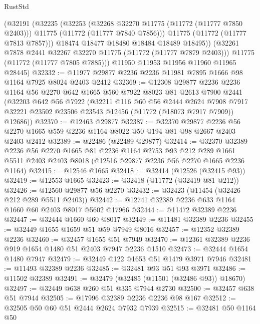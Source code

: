 \begin{lexlean}{RustStd}
\begin{coremodule}
          (@32191
            (@32235
              (@32253
                (@32268 @32270 @11775 (@11772 (@11777 @7850 @2403)))
                @11775
                (@11772 (@11777 @7840 @7856)))
              @11775
              (@11772 (@11777 @7813 @7857)))
            @18474
            @18477
            @18480
            @18484
            @18489
            @18495))
        (@32261 @7878 @2441 @32267 @32270 @11775 (@11772 (@11777 @7879 @2403)))
        @11775
        (@11772 (@11777 @7805 @7885)))
      @11950
      @11953
      @11956
      @11960
      @11965
      @28445)
@32332 := @11977 @29877 @2236 @2236 @11981 @7895 @1666 @98 @1164 @7925 @8024 @2403 @2412
@32369 := @12308
    @29877
    @2236
    @2236
    @1164
    @56
    @2270
    @642
    @1665
    @560
    @7922
    @8023
    @81
    @2613
    @7900
    @2441
    (@32203
      @642
      @56
      @7922
      (@32211
        @116
        @60
        @56
        @2444
        @2624
        @7908
        @7917
        @32221
        @23502
        @23506
        @23543
        @12456
        (@11772 (@18073 @7917 @7909))
        @12686))
@32370 := @12463 @29877
@32387 := @32370
    @29877
    @2236
    @56
    @2270
    @1665
    @559
    @2236
    @1164
    @8022
    @50
    @194
    @81
    @98
    @2667
    @2403
    @2403
    @2412
@32389 := @22486 (@22489 @29877)
@32414 := @32370
    @32389
    @2236
    @56
    @2270
    @1665
    @81
    @2236
    @1164
    @2753
    @93
    @212
    @289
    @1661
    @5511
    @2403
    @2403
    @8018
    (@12516 @29877 @2236 @56 @2270 @1665 @2236 @1164)
@32415 := @12546 @1665
@32418 := @32414 (@12526 (@32415 @93))
@32419 := @12553 @1665
@32423 := @32418 (@11772 (@32419 @81 @212))
@32426 := @12560 @29877 @56 @2270
@32432 := @32423 (@11454 (@32426 @212 @289 @5511 @2403))
@32442 := @12741 @32389 @2236 @633 @1164 @1660 @60 @2403 @8017 @5602 @17966
@32444 := @11472 @32389 @2236
@32447 := @32444 @1660 @60 @8017
@32449 := @11481 @32389 @2236
@32455 := @32449 @1655 @1659 @51 @59 @7949 @8016
@32457 := @12352 @32389 @2236
@32460 := @32457 @1655 @51 @7949
@32470 := @12361 @32389 @2236 @919 @1654 @1480 @51 @2403 @7947 @2236 @1510
@32473 := @32444 @1654 @1480 @7947
@32479 := @32449 @122 @1653 @51 @1479 @3971 @7946
@32481 := @11493 @32389 @2236
@32485 := @32481 @93 @51 @93 @3971
@32486 := @11502 @32389
@32491 := @32479 (@32485 (@11501 (@32486 @93)) @18670)
@32497 := @32449 @638 @260 @51 @335 @7944 @2730
@32500 := @32457 @638 @51 @7944
@32505 := @17996 @32389 @2236 @2236 @98 @167
@32512 := @32505 @50 @60 @51 @2444 @2624 @7932 @7939
@32515 := @32481 @50 @1164 @50

\end{coremodule}
\end{lexlean}
